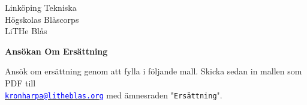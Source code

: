 
\begin{flushright}
    \Large{Linköping Tekniska \\
    Högskolas Blåscorps \\
    LiTHe Blås}
\end{flushright}

\vspace{4cm} %

\noindent\textbf{\LARGE Ansökan Om Ersättning}

\vspace{0.5cm}

\noindent Ansök om ersättning genom att fylla i följande mall. Skicka sedan in mallen som PDF till \\
\href{mailto:kronharpa@litheblas.org}{\textcolor{blue}{\texttt{kronharpa@litheblas.org}}} med ämnesraden "\texttt{Ersättning}".

\vspace{0.7cm}

